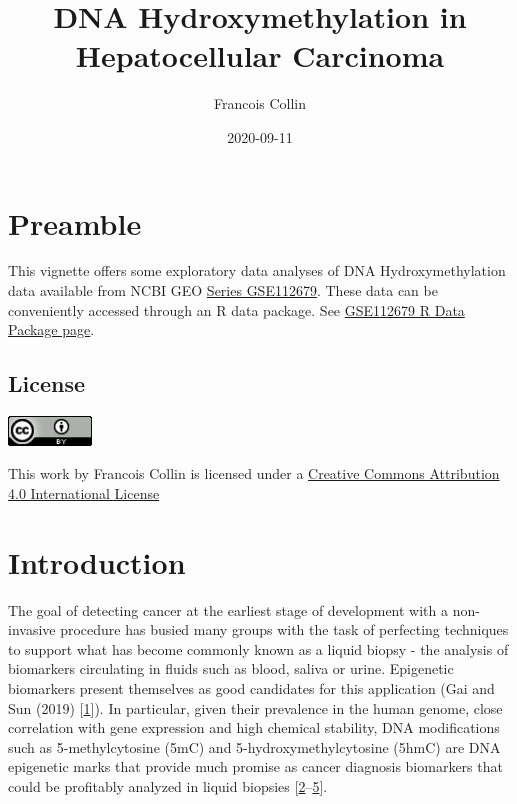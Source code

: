 \documentclass[
]{book}
\title{DNA Hydroxymethylation in Hepatocellular Carcinoma}
\author{Francois Collin}
\date{2020-09-11}
\begin{document}
\maketitle

{
\setcounter{tocdepth}{1}
\tableofcontents
}
\hypertarget{index}{%
\chapter*{Preamble}\label{index}}

This vignette offers some exploratory data analyses of
DNA Hydroxymethylation data available from
NCBI GEO \href{https://www.ncbi.nlm.nih.gov/geo/query/acc.cgi?acc=GSE112679}{Series GSE112679}.
These data can be conveniently accessed through an R data package.
See \href{https://12379monty.github.io/GSE112679/}{GSE112679 R Data Package page}.

\hypertarget{license}{%
\section*{License}\label{license}}

\includegraphics[width=0.88in]{Static/images/CC_4_0}

This work by Francois Collin is licensed under a
\href{http://creativecommons.org/licenses/by/4.0/}{Creative Commons Attribution 4.0 International License}

\hypertarget{intro}{%
\chapter{Introduction}\label{intro}}

The goal of detecting
cancer at the earliest stage of development with a non-invasive procedure
has busied many groups with the task of perfecting techniques to support
what has become commonly known as a
liquid biopsy - the analysis of biomarkers circulating in fluids such as blood,
saliva or urine. Epigenetic biomarkers present themselves as good candidates for this application
(Gai and Sun (2019) {[}\protect\hyperlink{ref-Gai:2019aa}{1}{]}). In particular,
given their prevalence in the human genome,
close correlation with gene expression and high chemical stability,
DNA modifications such as 5-methylcytosine (5mC) and 5-hydroxymethylcytosine (5hmC)
are DNA epigenetic marks that provide much promise as
cancer diagnosis biomarkers that could be profitably analyzed in liquid biopsies
{[}\protect\hyperlink{ref-Cai:2019aa}{2}--\protect\hyperlink{ref-Collin:2018aa}{5}{]}.
\end{document}
